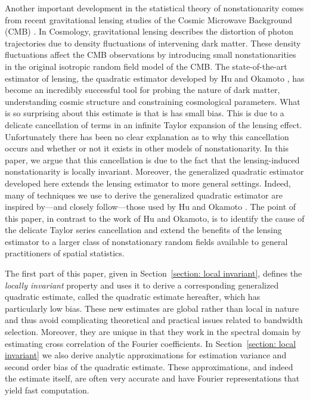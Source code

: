 \documentclass[10pt,noinfoline]{imsart}
\begin{document}
Another important development in the statistical theory of nonstationarity comes from recent gravitational lensing studies of the Cosmic Microwave Background (CMB) \citep{das2011detection,van2012measurement, planck2013lensing, Polarbear2014, planck2015lensing}. In Cosmology, gravitational lensing describes the distortion of photon trajectories due to density fluctuations of intervening dark matter. These density fluctuations affect the CMB observations by introducing small nonstationarities in the original isotropic random field model of the CMB. The state-of-the-art estimator of lensing, the quadratic estimator developed by Hu and Okamoto \cite{hu2001mapping, hu2002mass}, has become an incredibly successful tool for probing the nature of dark matter, understanding cosmic structure and constraining cosmological parameters. What is so surprising about this estimate is that is has small bias. This is due to a delicate cancellation of terms in an infinite Taylor expansion of the lensing effect. Unfortunately there has been no clear explanation as to why this cancellation occurs and whether or not it exists in other models of nonstationarity. In this paper, we argue that this cancellation is due to the fact that the lensing-induced nonstationarity is locally invariant. Moreover, the generalized quadratic estimator developed here extends the lensing estimator to more general settings. Indeed, many of techniques we use to derive the generalized quadratic estimator are inspired by---and closely follow---those used by Hu and Okamoto \cite{hu2001mapping, hu2002mass}.  The point of this paper, in contrast to the work of Hu and Okamoto, is to identify the cause of the delicate Taylor series cancellation and extend the benefits of the lensing estimator to a larger class of nonstationary random fields available to general practitioners of spatial statistics.
 

The first part of this paper, given in Section~\ref{section: local invariant}, defines the {\it locally invariant} property and uses it to derive a corresponding generalized quadratic estimate, called the quadratic estimate hereafter,  which has particularly low bias. These new estimates are global rather than local in nature and thus avoid complicating theoretical and practical issues related to bandwidth selection. Moreover, they are unique in that they work in the spectral domain by estimating cross correlation of the Fourier coefficients.  In Section~\ref{section: local invariant} we also derive analytic approximations for estimation variance and second order bias of the quadratic estimate. These approximations, and indeed the estimate itself, are often very accurate and have Fourier representations that yield fast computation.
\end{document}
